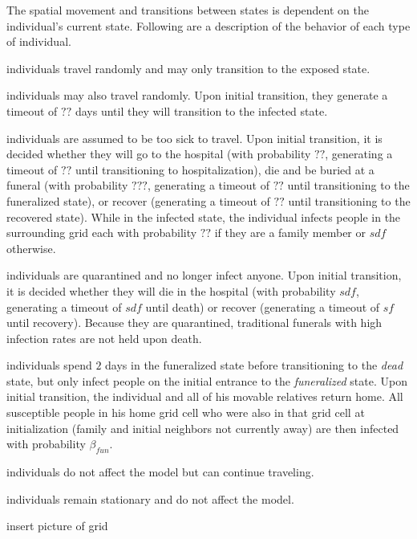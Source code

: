 The spatial movement and transitions between states is dependent on the individual's current state. Following are a description of the behavior of each type of individual.
\begin{description}[labelsep=1.5mm]
\setlength\itemsep{-3mm}
\item[Susceptible] individuals travel randomly and may only transition to the exposed state.\\
\item[Exposed] individuals may also travel randomly. Upon initial transition, they generate a timeout of $??$ days until they will transition to the infected state.\\
\item[Infected] individuals are assumed to be too sick to travel. Upon initial transition, it is decided whether they will go to the hospital (with probability $??$, generating a timeout of $??$ until transitioning to hospitalization), die and be buried at a funeral (with probability $???$, generating a timeout of $??$ until transitioning to the funeralized state), or recover (generating a timeout of $??$ until transitioning to the recovered state). While in the infected state, the individual infects people in the surrounding grid each with probability $??$ if they are a family member or $sdf$ otherwise.\\
\item[Hospitalized] individuals are quarantined and no longer infect anyone. Upon initial transition, it is decided whether they will die in the hospital (with probability $sdf$, generating a timeout of $sdf$ until death) or recover (generating a timeout of $sf$ until recovery). Because they are quarantined, traditional funerals with high infection rates are not held upon death.\\
\item[Funeralized] individuals spend $2$ days in the funeralized state before transitioning to the \emph{dead} state, but only infect people on the initial entrance to the \emph{funeralized} state. Upon initial transition, the individual and all of his movable relatives return home. All susceptible people in his home grid cell who were also in that grid cell at initialization (family and initial neighbors not currently away) are then infected with probability $\beta_{fun}$.\\
\item[Recovered] individuals do not affect the model but can continue traveling.\\
\item[Dead] individuals remain stationary and do not affect the model.\\
\end{description}
insert picture of grid

